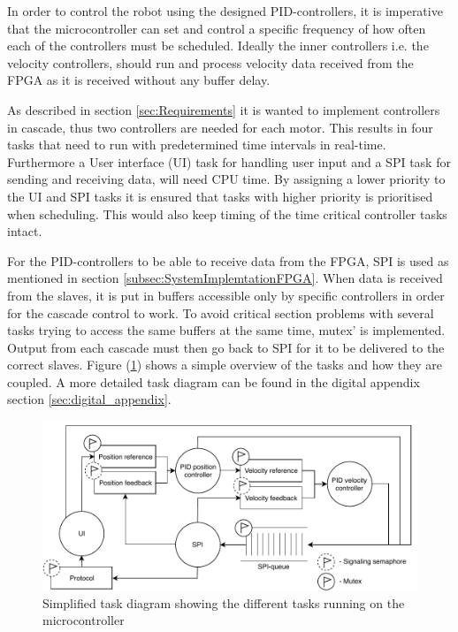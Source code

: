 \documentclass[../../main.tex]{subfiles}
\begin{document}
In order to control the robot using the designed PID-controllers, it is imperative that the microcontroller can set and control a specific frequency of how often each of the controllers must be scheduled. Ideally the inner controllers i.e. the velocity controllers, should run and process velocity data received from the FPGA as it is received without any buffer delay. 

As described in section \ref{sec:Requirements} it is wanted to implement controllers in cascade, thus two controllers are needed for each motor. This results in four tasks that need to run with predetermined time intervals in real-time. Furthermore a User interface (UI) task for handling user input and a SPI task for sending and receiving data, will need CPU time. By assigning a lower priority to the UI and SPI tasks it is ensured that tasks with higher priority is prioritised when scheduling. This would also keep timing of the time critical controller tasks intact. 

For the PID-controllers to be able to receive data from the FPGA, SPI is used as mentioned in section \ref{subsec:SystemImplemtationFPGA}. When data is received from the slaves, it is put in buffers accessible only by specific controllers in order for the cascade control to work. To avoid critical section problems with several tasks trying to access the same buffers at the same time, mutex' is implemented. Output from each cascade must then go back to SPI for it to be delivered to the correct slaves. Figure (\ref{fig:OverviewTaskDiagramSimple}) shows a simple overview of the tasks and how they are coupled. A more detailed task diagram can be found in the digital appendix section \ref{sec:digital_appendix}.

\begin{figure}[H]
    \centering
    \includegraphics[width=\textwidth]{Sections/System_Implementation/Images/OverviewTaskDiagramSimple.pdf}
    \caption{Simplified task diagram showing the different tasks running on the microcontroller}
    \label{fig:OverviewTaskDiagramSimple}
\end{figure}
\end{document}
